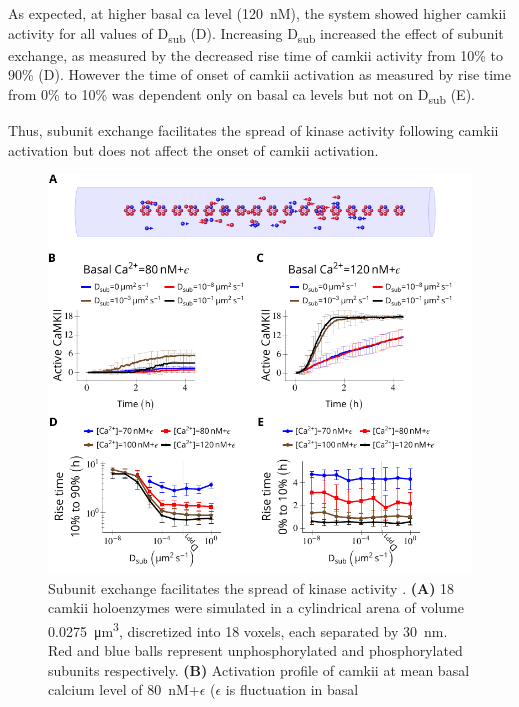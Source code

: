 \documentclass[9pt,lineno,doublespacing]{elife}
\newcommand\SUB[2]{#1\textsubscript{#2}}
\begin{document}
As expected, at higher basal \gls{ca} level (\SI{120}{\nano M}), the system
showed higher \gls{camkii} activity for all values of \SUB{D}{sub}
(D). Increasing \SUB{D}{sub} increased the
effect of subunit exchange, as measured by the decreased rise time of
\gls{camkii} activity from 10\% to 90\% (D).
However the time of onset of \gls{camkii} activation as measured by rise time
from 0\% to 10\% was dependent only on basal \gls{ca} levels but not on
\SUB{D}{sub} (E).

Thus, subunit exchange facilitates the spread of kinase activity following
\gls{camkii} activation but does not affect the onset of \gls{camkii}
activation.

\begin{figure}
    \includegraphics[width=0.95\linewidth]{./PaperFigures/elifeFigure4/figure_camkii_activation_130mm.pdf}
    \caption{Subunit exchange facilitates the spread of kinase activity
        \citep{stratton_activation-triggered_2014}. \textbf{(A)} 18 \gls{camkii}
        holoenzymes were simulated in a cylindrical arena of volume
        \SI{0.0275}{\cubic\micro\meter}, discretized into 18 voxels, each
        separated by \SI{30}{\nano\meter}. Red and blue balls represent
        unphosphorylated and phosphorylated subunits respectively.
        \textbf{(B)} Activation profile of \gls{camkii} at mean basal calcium
        level of \SI{80}{\nano M}+$\epsilon$ ($\epsilon$ is fluctuation in basal
}
\end{figure}
\end{document}
